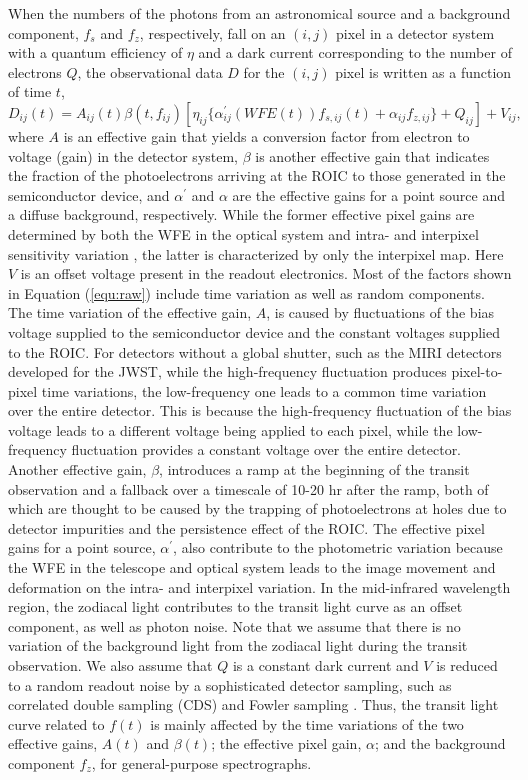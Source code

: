 \documentclass{aastex62}
\begin{document}
When the numbers of the photons from an astronomical source and a background component, $f_s$ and $f_z$, respectively, fall on an $(i, j)$ pixel in a detector system with a quantum efficiency of $\eta$ and a dark current corresponding to the number of electrons $Q$, the observational data $D$ for the $(i, j)$ pixel is written as a function of time $t$,
\begin{equation} \label{equ:raw}
D_{ij}(t) = A_{ij}(t)\beta(t,f_{ij})[\eta_{ij}\{\alpha^{'}_{ij}(WFE(t))f_{s,ij}(t)+\alpha_{ij}f_{z,ij}\}+Q_{ij}]+V_{ij} ,
\end{equation}
where $A$ is an effective gain that yields a conversion factor from electron to voltage (gain) in the detector system, $\beta$ is another effective gain that indicates the fraction of the photoelectrons arriving at the ROIC to those generated in the semiconductor device, and $\alpha^{'}$ and $\alpha$ are the effective gains for a point source and a diffuse background, respectively. While the former effective pixel gains are determined by both the WFE in the optical system and intra- and interpixel sensitivity variation \citep[e.g.,][]{2007PASP..119..466B, 2014ASPC..485..407C}, the latter is characterized by only the interpixel map. Here $V$ is an offset voltage present in the readout electronics. Most of the factors shown in Equation (\ref{equ:raw}) include time variation as well as random components. The time variation of the effective gain, $A$, is caused by fluctuations of the bias voltage supplied to the semiconductor device and the constant voltages supplied to the ROIC. For detectors without a global shutter, such as the MIRI detectors developed for the JWST, while the high-frequency fluctuation produces pixel-to-pixel time variations, the low-frequency one leads to a common time variation over the entire detector. This is because the high-frequency fluctuation of the bias voltage leads to a different voltage being applied to each pixel, while the low-frequency fluctuation provides a constant voltage over the entire detector. Another effective gain, $\beta$, introduces a ramp at the beginning of the transit observation and a fallback over a timescale of 10-20 hr after the ramp, both of which are thought to be caused by the trapping of photoelectrons at holes due to detector impurities and the persistence effect of the ROIC. The effective pixel gains for a point source, $\alpha^{'}$, also contribute to the photometric variation because the WFE in the telescope and optical system leads to the image movement and deformation on the intra- and interpixel variation. In the mid-infrared wavelength region, the zodiacal light contributes to the transit light curve as an offset component, as well as photon noise. Note that we assume that there is no variation of the background light from the zodiacal light during the transit observation. We also assume that $Q$ is a constant dark current and $V$ is reduced to a random readout noise by a sophisticated detector sampling, such as correlated double sampling (CDS) and Fowler sampling \citep{2016Wiley.v2}. Thus, the transit light curve related to $f(t)$ is mainly affected by the time variations of the two effective gains, $A(t)$ and $\beta (t)$; the effective pixel gain, $\alpha$; and the background component $f_z$, for general-purpose spectrographs.
\end{document}
